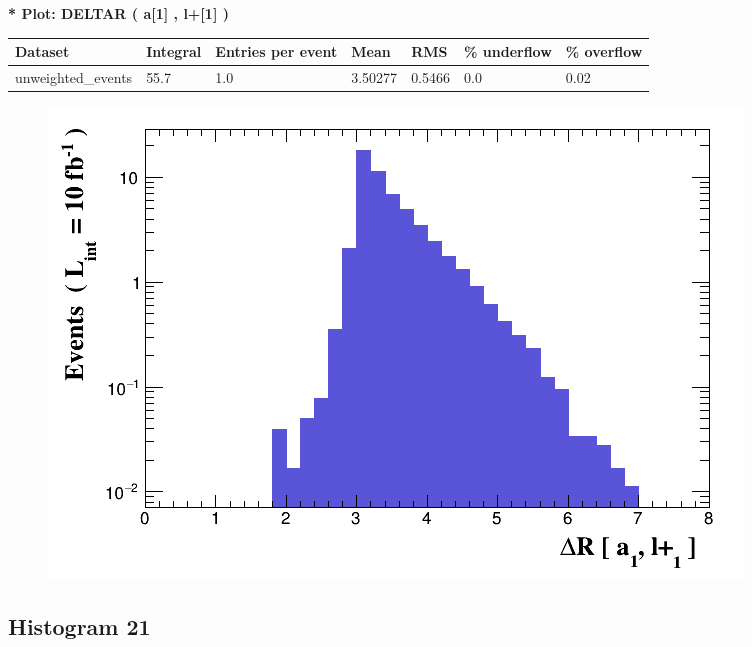 \documentclass[a4paper, 10pt]{article}
\begin{document}
\textbf{* Plot: DELTAR ( a[1] , l+[1] ) }\\
   \begin{table}[H]
  \begin{center}
    \begin{tabular}{|m{23.0mm}|m{23.0mm}|m{18.0mm}|m{19.0mm}|m{19.0mm}|m{19.0mm}|m{19.0mm}|}
      \hline
      {\cellcolor{yellow}         Dataset}& {\cellcolor{yellow}         Integral}& {\cellcolor{yellow}         Entries per event}& {\cellcolor{yellow}         Mean}& {\cellcolor{yellow}         RMS}& {\cellcolor{yellow}         \% underflow}& {\cellcolor{yellow}         \% overflow}\\
      \hline
      {\cellcolor{white}         unweighted\_events}& {\cellcolor{white}         55.7}& {\cellcolor{white}         1.0}& {\cellcolor{white}         3.50277}& {\cellcolor{white}         0.5466}& {\cellcolor{green}         0.0}& {\cellcolor{green}         0.02}\\
\hline
    \end{tabular}
  \end{center}
\end{table}

\begin{figure}[H]
  \begin{center}
    \includegraphics[scale=0.45]{selection_19.png}\\
\caption{   }
  \end{center}
\end{figure}
      \newpage
\subsection{ Histogram 21}
\end{document}
